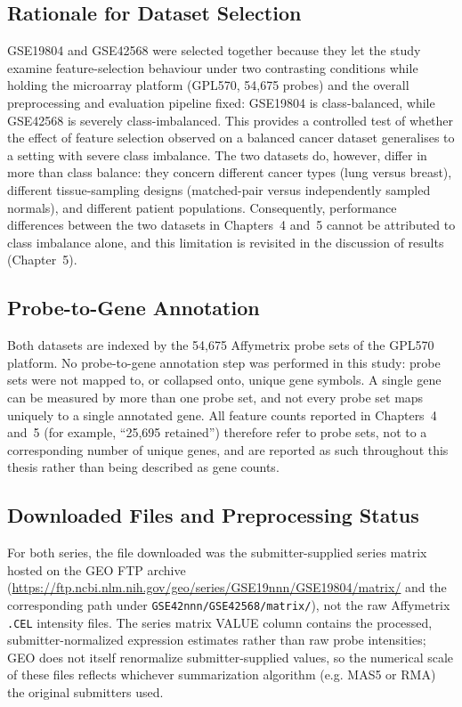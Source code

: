 \subsection{Rationale for Dataset Selection}

GSE19804 and GSE42568 were selected together because they let the study examine feature-selection behaviour under two contrasting conditions while holding the microarray platform (GPL570, 54,675 probes) and the overall preprocessing and evaluation pipeline fixed: GSE19804 is class-balanced, while GSE42568 is severely class-imbalanced. This provides a controlled test of whether the effect of feature selection observed on a balanced cancer dataset generalises to a setting with severe class imbalance. The two datasets do, however, differ in more than class balance: they concern different cancer types (lung versus breast), different tissue-sampling designs (matched-pair versus independently sampled normals), and different patient populations. Consequently, performance differences between the two datasets in Chapters~4 and~5 cannot be attributed to class imbalance alone, and this limitation is revisited in the discussion of results (Chapter~5).

\subsection{Probe-to-Gene Annotation}

Both datasets are indexed by the 54,675 Affymetrix probe sets of the GPL570 platform. No probe-to-gene annotation step was performed in this study: probe sets were not mapped to, or collapsed onto, unique gene symbols. A single gene can be measured by more than one probe set, and not every probe set maps uniquely to a single annotated gene. All feature counts reported in Chapters~4 and~5 (for example, ``25,695 retained'') therefore refer to probe sets, not to a corresponding number of unique genes, and are reported as such throughout this thesis rather than being described as gene counts.

\subsection{Downloaded Files and Preprocessing Status}
\label{sec:geo_files}

For both series, the file downloaded was the submitter-supplied series matrix hosted on the GEO FTP archive (\url{https://ftp.ncbi.nlm.nih.gov/geo/series/GSE19nnn/GSE19804/matrix/} and the corresponding path under \texttt{GSE42nnn/GSE42568/matrix/}), not the raw Affymetrix \texttt{.CEL} intensity files. The series matrix VALUE column contains the processed, submitter-normalized expression estimates rather than raw probe intensities; GEO does not itself renormalize submitter-supplied values, so the numerical scale of these files reflects whichever summarization algorithm (e.g. MAS5 or RMA) the original submitters used.

